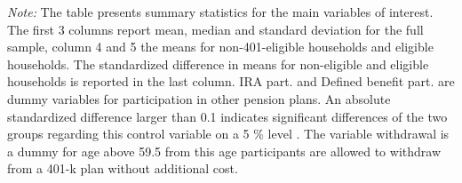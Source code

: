 \begin{tiny}
			\def\sym#1{\ifmmode^{#1}\else\(^{#1}\)\fi}
			\begin{ThreePartTable}
				\begin{TableNotes}
					\begin{scriptsize}
					\item \textit{Note:} The table presents summary statistics for the main variables of interest. The first 3 columns report mean, median and standard deviation for the full sample, column 4 and 5 the means for non-401-eligible households and eligible households. The standardized difference in means for non-eligible and eligible households is reported in the last column. IRA part. and Defined benefit part. are dummy variables for participation in other pension plans. An absolute standardized difference larger than 0.1 indicates significant differences of the two groups regarding this control variable on a 5 \% level \citep[see][]{standardized_difference}. The variable withdrawal is a dummy for age above 59.5 \textemdash from this age participants are allowed to withdraw from a 401-k plan without additional cost.
					\end{scriptsize}
				\end{TableNotes}
				

\end{ThreePartTable}
\end{tiny}
